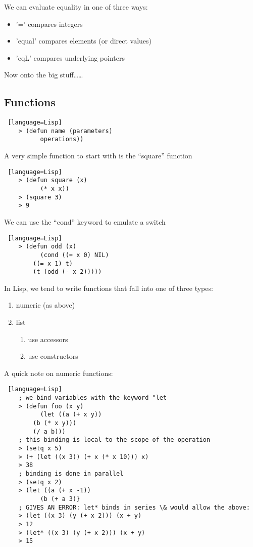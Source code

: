 \documentclass[../../lecture_notes.tex]{subfiles}
\begin{document}
\noindent We can evaluate equality in one of three ways:\\
\begin{itemize}
	\item '=' compares integers
	\item 'equal' compares elements (or direct values)
    	\item 'eqL' compares underlying pointers
\end{itemize} \medskip

\noindent Now onto the big stuff……
\subsection*{Functions}
\begin{lstlisting} [language=Lisp]
	> (defun name (parameters)
	      operations))
\end{lstlisting} \medskip

\noindent A very simple function to start with is the “square” function
\begin{lstlisting} [language=Lisp]
	> (defun square (x)
	      (* x x))
	> (square 3)
	> 9
\end{lstlisting} \medskip

\noindent We can use the “cond” keyword to emulate a switch
\begin{lstlisting} [language=Lisp]
	> (defun odd (x)
	      (cond ((= x 0) NIL)
		((= x 1) t)
		(t (odd (- x 2)))))
\end{lstlisting} \medskip

\noindent In Lisp, we tend to write functions that fall into one of three types:
\begin{enumerate}
	\item numeric (as above)
	\item list
	\begin{enumerate}
		\item use accessors
		\item use constructors
	\end{enumerate}
\end{enumerate} \medskip

\noindent A quick note on numeric functions:
\begin{lstlisting} [language=Lisp]
	; we bind variables with the keyword "let
	> (defun foo (x y)
	      (let ((a (+ x y))
		(b (* x y)))
		(/ a b)))
	; this binding is local to the scope of the operation
	> (setq x 5)
	> (+ (let ((x 3)) (+ x (* x 10))) x)
	> 38
	; binding is done in parallel
	> (setq x 2)
	> (let ((a (+ x -1))
	      (b (+ a 3)}
	; GIVES AN ERROR: let* binds in series \& would allow the above:
	> (let ((x 3) (y (+ x 2))) (x + y)
	> 12
	> (let* ((x 3) (y (+ x 2))) (x + y)
	> 15
\end{lstlisting} \medskip
\end{document}
